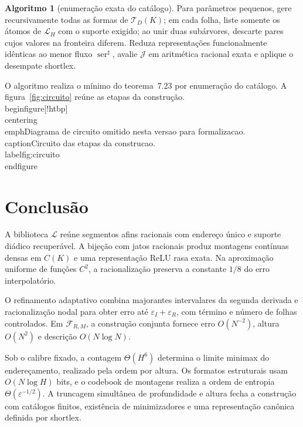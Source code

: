 \documentclass[11pt,a4paper]{article}
\theoremstyle{preciso}
\theoremstyle{definition}
\newtheorem{algoritmo}[teorema]{Algoritmo}
\newcommand{\LL}{\mathcal L}
\newcommand{\FF}{\mathcal F}
\newcommand{\ser}{\operatorname{ser}}
\begin{document}
\begin{algoritmo}[enumeração exata do catálogo]
\leavevmode\par\nobreak\noindent
Para parâmetros pequenos, gere recursivamente todas as formas de $\mathcal T_D(K)$; em cada folha, liste somente os átomos de $\LL_H$ com o suporte exigido; ao unir duas subárvores, descarte pares cujos valores na fronteira diferem. Reduza representações funcionalmente idênticas ao menor fluxo $\ser^\sharp$, avalie $\mathcal J$ em aritmética racional exata e aplique o desempate shortlex.
\end{algoritmo}
O algoritmo realiza o mínimo do teorema~7.23 por enumeração do catálogo. A figura~\ref{fig:circuito} reúne as etapas da construção.
\\begin{figure}[!htbp]\\centering
 \\emph{Diagrama de circuito omitido nesta versao para formalizacao.}
 \\caption{Circuito das etapas da construcao.}\\label{fig:circuito}
 \\end{figure}
\clearpage





\section{Conclusão}
A biblioteca $\LL$ reúne segmentos afins racionais com endereço único e suporte diádico recuperável. A bijeção com jatos racionais produz montagens contínuas densas em $C(K)$ e uma representação ReLU rasa exata. Na aproximação uniforme de funções $C^2$, a racionalização preserva a constante $1/8$ do erro interpolatório.

O refinamento adaptativo combina majorantes intervalares da segunda derivada e racio\-na\-li\-za\-ção nodal para obter erro até $\varepsilon_I+\varepsilon_R$, com término e número de folhas controlados. Em $\FF_{R,M}$, a construção conjunta fornece erro $O(N^{-2})$, altura $O(N^2)$ e descrição $O(N\log N)$.

Sob o calibre fixado, a contagem $\Theta(H^6)$ determina o limite minimax do endereçamento, realizado pela ordem por altura. Os formatos estruturais usam $O(N\log H)$ bits, e o codebook de montagens realiza a ordem de entropia $\Theta(\varepsilon^{-1/2})$. A truncagem simultânea de profundidade e altura fecha a construção com catálogos finitos, existência de minimizadores e uma representação canônica definida por shortlex.
\end{document}
